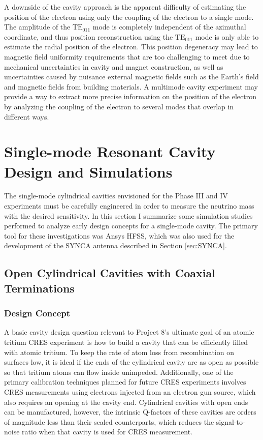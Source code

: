 A downside of the cavity approach is the apparent difficulty of estimating the position of the electron using only the coupling of the electron to a single mode. The amplitude of the $\mathrm{TE}_{011}$ mode is completely independent of the azimuthal coordinate, and thus position reconstruction using the $\mathrm{TE}_{011}$ mode is only able to estimate the radial position of the electron. This position degeneracy may lead to magnetic field uniformity requirements that are too challenging to meet due to mechanical uncertainties in cavity and magnet construction, as well as uncertainties caused by nuisance external magnetic fields such as the Earth's field and magnetic fields from building materials. A multimode cavity experiment may provide a way to extract more precise information on the position of the electron by analyzing the coupling of the electron to several modes that overlap in different ways.

\section{Single-mode Resonant Cavity Design and Simulations}
\label{sec:chap6-single-mode-cavity-sims}

The single-mode cylindrical cavities envisioned for the Phase III and IV experiments must be carefully engineered in order to measure the neutrino mass with the desired sensitivity. In this section I summarize some simulation studies performed to analyze early design concepts for a single-mode cavity. The primary tool for these investigations was Ansys HFSS, which was also used for the development of the SYNCA antenna described in Section \ref{sec:SYNCA}. 

\subsection{Open Cylindrical Cavities with Coaxial Terminations}
\label{sec:chap6-open-cavities}

\subsubsection*{Design Concept}

A basic cavity design question relevant to Project 8's ultimate goal of an atomic tritium CRES experiment is how to build a cavity that can be efficiently filled with atomic tritium. To keep the rate of atom loss from recombination on surfaces low, it is ideal if the ends of the cylindrical cavity are as open as possible so that tritium atoms can flow inside unimpeded. Additionally, one of the primary calibration techniques planned for future CRES experiments involves CRES measurements using electrons injected from an electron gun source, which also requires an opening at the cavity end. Cylindrical cavities with open ends can be manufactured, however, the intrinsic Q-factors of these cavities are orders of magnitude less than their sealed counterparts, which reduces the signal-to-noise ratio when that cavity is used for CRES measurement.


